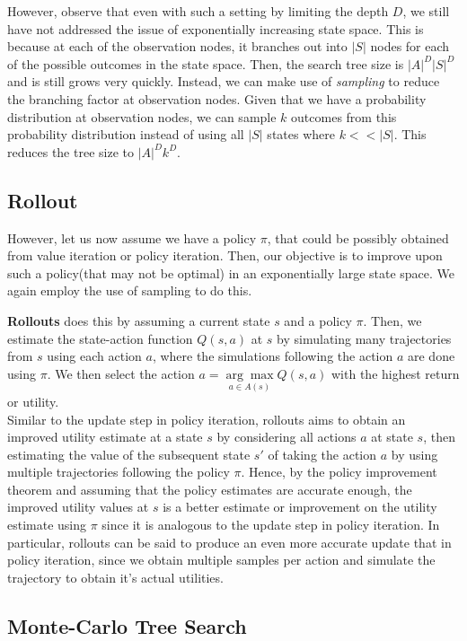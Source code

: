 \documentclass[11pt]{article}
\begin{document}
However, observe that even with such a setting by limiting the depth $D$, we still have not addressed the issue of exponentially increasing state space. This is because at each of the observation nodes, it branches out into $|S|$ nodes for each of the possible outcomes in the state space. Then, the search tree size is $|A|^D|S|^D$ and is still grows very quickly. Instead, we can make use of \textit{sampling} to reduce the branching factor at observation nodes. Given that we have a probability distribution at observation nodes, we can sample $k$ outcomes from this probability distribution instead of using all $|S|$ states where $k << |S|$. This reduces the tree size to $|A|^D k^D$.

\subsection{Rollout}

However, let us now assume we have a policy $\pi$, that could be possibly obtained from value iteration or policy iteration. Then, our objective is to improve upon such a policy(that may not be optimal) in an exponentially large state space. We again employ the use of sampling to do this.

\textbf{Rollouts} does this by assuming a current state $s$ and a policy $\pi$. Then, we estimate the state-action function $Q(s, a)$ at $s$ by simulating many trajectories from $s$ using each action $a$, where the simulations following the action $a$ are done using $\pi$. We then select the action $a = \underset{a \in A(s)}{\arg\max} Q(s, a)$ with the highest return or utility.\\

Similar to the update step in policy iteration, rollouts aims to obtain an improved utility estimate at a state $s$ by considering all actions $a$ at state $s$, then estimating the value of the subsequent state $s'$ of taking the action $a$ by using multiple trajectories following the policy $\pi$. Hence, by the policy improvement theorem and assuming that the policy estimates are accurate enough, the improved utility values at $s$ is a better estimate or improvement on the utility estimate using $\pi$ since it is analogous to the update step in policy iteration. In particular, rollouts can be said to produce an even more accurate update that in policy iteration, since we obtain multiple samples per action and simulate the trajectory to obtain it's actual utilities.

\subsection{Monte-Carlo Tree Search}
\end{document}

